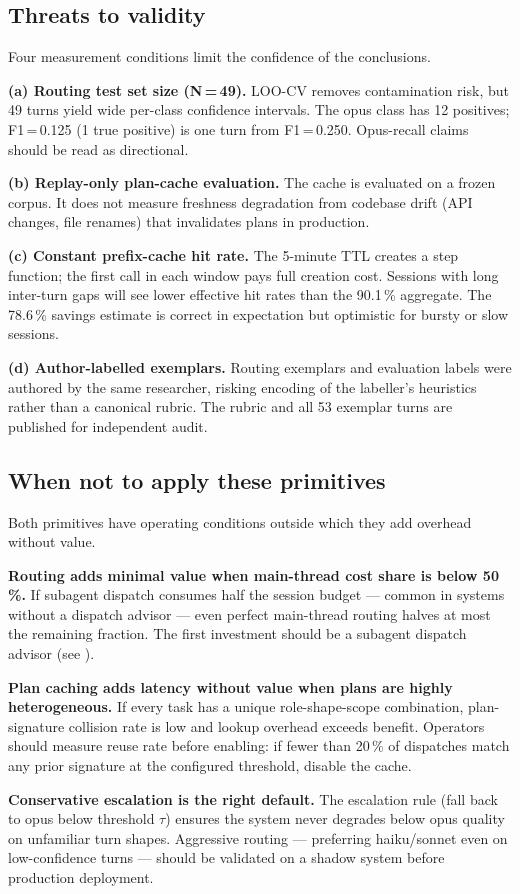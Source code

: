 \subsection{Threats to validity}

Four measurement conditions limit the confidence of the conclusions.

\textbf{(a) Routing test set size (N\,=\,49).} LOO-CV removes contamination risk, but 49 turns yield wide per-class confidence intervals. The opus class has 12 positives; F1\,=\,0.125 (1 true positive) is one turn from F1\,=\,0.250. Opus-recall claims should be read as directional.

\textbf{(b) Replay-only plan-cache evaluation.} The cache is evaluated on a frozen corpus. It does not measure freshness degradation from codebase drift (API changes, file renames) that invalidates plans in production.

\textbf{(c) Constant prefix-cache hit rate.} The 5-minute TTL creates a step function; the first call in each window pays full creation cost. Sessions with long inter-turn gaps will see lower effective hit rates than the 90.1\,\% aggregate. The 78.6\,\% savings estimate is correct in expectation but optimistic for bursty or slow sessions.

\textbf{(d) Author-labelled exemplars.} Routing exemplars and evaluation labels were authored by the same researcher, risking encoding of the labeller's heuristics rather than a canonical rubric. The rubric and all 53 exemplar turns are published for independent audit.

\subsection{When not to apply these primitives}

Both primitives have operating conditions outside which they add overhead without value.

\textbf{Routing adds minimal value when main-thread cost share is below 50\,\%.} If subagent dispatch consumes half the session budget --- common in systems without a dispatch advisor --- even perfect main-thread routing halves at most the remaining fraction. The first investment should be a subagent dispatch advisor (see \cite{moa1landscape}).

\textbf{Plan caching adds latency without value when plans are highly heterogeneous.} If every task has a unique role-shape-scope combination, plan-signature collision rate is low and lookup overhead exceeds benefit. Operators should measure reuse rate before enabling: if fewer than 20\,\% of dispatches match any prior signature at the configured threshold, disable the cache.

\textbf{Conservative escalation is the right default.} The escalation rule (fall back to opus below threshold $\tau$) ensures the system never degrades below opus quality on unfamiliar turn shapes. Aggressive routing --- preferring haiku/sonnet even on low-confidence turns --- should be validated on a shadow system before production deployment.

